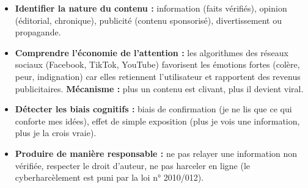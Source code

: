 \documentclass[11pt]{article}
\begin{document}
\begin{aretenir}
\begin{itemize}
    \item \textbf{Identifier la nature du contenu :} information (faits vérifiés), opinion (éditorial, chronique), publicité (contenu sponsorisé), divertissement ou propagande.
    \item \textbf{Comprendre l'économie de l'attention :} les algorithmes des réseaux sociaux (Facebook, TikTok, YouTube) favorisent les émotions fortes (colère, peur, indignation) car elles retiennent l'utilisateur et rapportent des revenus publicitaires. \textbf{Mécanisme :} plus un contenu est clivant, plus il devient viral.
    \item \textbf{Détecter les biais cognitifs :} biais de confirmation (je ne lis que ce qui conforte mes idées), effet de simple exposition (plus je vois une information, plus je la crois vraie).
    \item \textbf{Produire de manière responsable :} ne pas relayer une information non vérifiée, respecter le droit d'auteur, ne pas harceler en ligne (le cyberharcèlement est puni par la loi n° 2010/012).
\end{itemize}
\end{aretenir}
\end{document}
